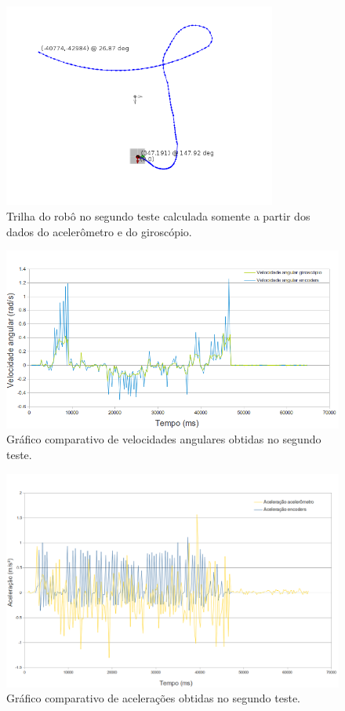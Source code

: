 \begin{figure}[H]
	\centering
	\includegraphics[width=0.8\textwidth]{./figuras/testes/teste2/mapa_acelerometro.png}
	\caption{Trilha do robô no segundo teste calculada somente a partir dos dados do acelerômetro e do giroscópio.}
	\label{fig:teste2_mapa_acelerometro}
\end{figure}

\begin{figure}[H]
	\centering
	\includegraphics[width=1\textwidth]{./figuras/testes/teste2/grafico_giro.png}
	\caption{Gráfico comparativo de velocidades angulares obtidas no segundo teste.}
	\label{fig:teste2_giro_grafico}
\end{figure}

\begin{figure}[H]
	\centering
	\includegraphics[width=1\textwidth]{./figuras/testes/teste2/grafico_acel.png}
	\caption{Gráfico comparativo de acelerações obtidas no segundo teste.}
	\label{fig:teste2_acel_grafico}
\end{figure}

